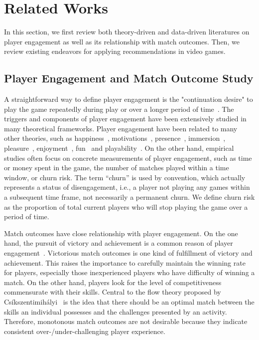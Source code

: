 \chapter{Related Works} %

\label{chapter:relatework} %

In this section, we first review both theory-driven and data-driven literatures on player engagement as well as its relationship with match outcomes. Then, we review existing endeavors for applying recommendations in video games.

\section{ Player Engagement and Match Outcome Study}
A straightforward way to define player engagement is the "continuation desire" to play the game repeatedly during play or over a longer period of time~\cite{schoenau2011player}. The triggers and components of player engagement have been extensively studied in many theoretical frameworks. Player engagement have been related to many other theories, such as happiness~\cite{sweetser2005gameflow,flow1990psychology,chen2007flow}, motivations~\cite{przybylski2010motivational,ryan2006motivational,yee2006demographics,yee2006motivations,sherry2006video}, presence~\cite{lombard1997heart,tamborini2006role}, immersion~\cite{mcmahan2003immersion,brown2004grounded,jennett2008measuring,ermi2005fundamental}, pleasure~\cite{costello2009tool}, enjoyment~\cite{ijsselsteijn2013game,klimmt2003dimensions}, fun~\cite{koster2013theory} and playability~\cite{federoff2003improving,federoff2002heuristics,desurvire2004using,nacke2009playability}. On the other hand, empirical studies often focus on concrete measurements of player engagement, such as time or money spent in the game, the number of matches played within a time window, or churn risk. The term ``churn'' is used by convention, which actually represents a status of disengagement, i.e., a player not playing any games within a subsequent time frame, not necessarily a permanent churn. We define churn risk as the proportion of total current players who will stop playing the game over a period of time. 

Match outcomes have close relationship with player engagement. On the one hand, the pursuit of victory and achievement is a common reason of player engagement~\cite{schoenau2011player,yee2006motivations,sherry2006video,wu2010falling}. Victorious match outcomes is one kind of fulfillment of victory and achievement. This raises the importance to carefully maintain the winning rate for players, especially those inexperienced players who have difficulty of winning a match. On the other hand, players look for the level of competitiveness commensurate with their skills. Central to the flow theory proposed by Cs\'{i}kszentimih\'{a}lyi~\cite{sweetser2005gameflow,flow1990psychology,chen2007flow} is the idea that there should be an optimal match between the skills an individual possesses and the challenges presented by an activity. Therefore, monotonous match outcomes are not desirable because they indicate consistent over-/under-challenging player experience. 


